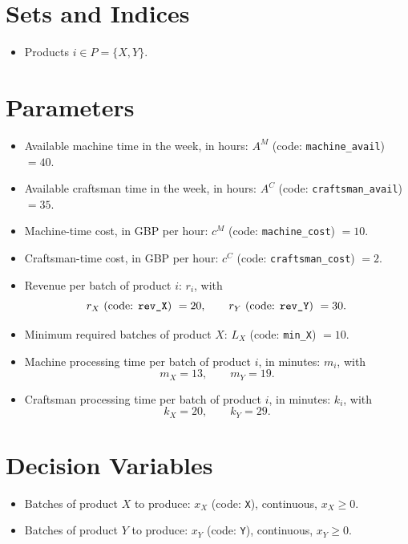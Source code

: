 \section*{Sets and Indices}

\begin{itemize}
    \item Products $i \in P = \{X,Y\}$.
\end{itemize}

\section*{Parameters}

\begin{itemize}
    \item Available machine time in the week, in hours: $A^{M}$ (code: \texttt{machine\_avail}) $=40$.
    \item Available craftsman time in the week, in hours: $A^{C}$ (code: \texttt{craftsman\_avail}) $=35$.
    \item Machine-time cost, in GBP per hour: $c^{M}$ (code: \texttt{machine\_cost}) $=10$.
    \item Craftsman-time cost, in GBP per hour: $c^{C}$ (code: \texttt{craftsman\_cost}) $=2$.
    \item Revenue per batch of product $i$: $r_i$, with
    \[
    r_X \text{ (code: \texttt{rev\_X}) } = 20,\qquad
    r_Y \text{ (code: \texttt{rev\_Y}) } = 30.
    \]
    \item Minimum required batches of product $X$: $L_X$ (code: \texttt{min\_X}) $=10$.
    \item Machine processing time per batch of product $i$, in minutes: $m_i$, with
    \[
    m_X = 13,\qquad m_Y = 19.
    \]
    \item Craftsman processing time per batch of product $i$, in minutes: $k_i$, with
    \[
    k_X = 20,\qquad k_Y = 29.
    \]
\end{itemize}

\section*{Decision Variables}

\begin{itemize}
    \item Batches of product $X$ to produce: $x_X$ (code: \texttt{X}), continuous, $x_X \ge 0$.
    \item Batches of product $Y$ to produce: $x_Y$ (code: \texttt{Y}), continuous, $x_Y \ge 0$.
\end{itemize}


